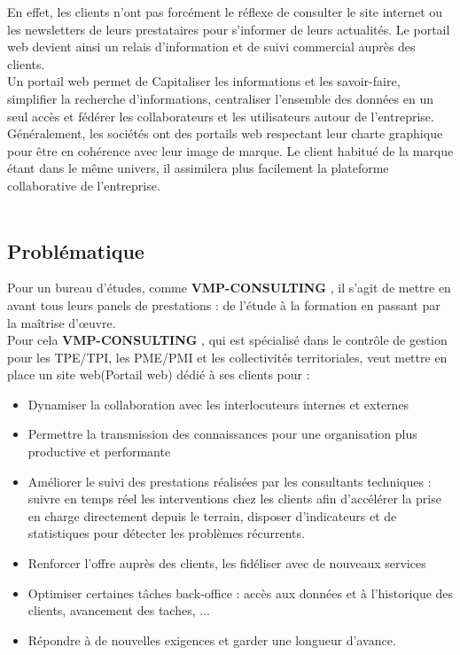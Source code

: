 \documentclass[12pt]{article}
\begin{document}
En effet, les clients n’ont pas forcément le réflexe de consulter le site internet ou les newsletters de leurs prestataires pour s’informer de leurs actualités. Le portail web devient ainsi un relais d’information et de suivi commercial auprès des clients.\\ Un portail web  permet de  Capitaliser les informations et les savoir-faire,
    simplifier la recherche d’informations,
    centraliser l’ensemble des données en un seul accès et
    fédérer les collaborateurs et les utilisateurs autour de l’entreprise.
\\
Généralement, les sociétés ont des portails web respectant leur charte graphique pour être en cohérence avec leur image de marque. Le client habitué de la marque étant dans le même univers, il assimilera plus facilement la plateforme collaborative de l’entreprise.\\

 \\
 
 \subsection{Problématique}
Pour un bureau d’études, comme \textbf{VMP-CONSULTING} , il s’agit de mettre en avant tous leurs panels de prestations : de l’étude à la formation en passant par la maîtrise d’œuvre.\\
Pour cela \textbf{VMP-CONSULTING} , qui est spécialisé dans le contrôle de gestion pour les TPE/TPI, les PME/PMI et les collectivités territoriales, veut mettre en place un site web(Portail web) dédié à ses clients pour :\\

\begin{itemize}

\item  Dynamiser la collaboration avec les interlocuteurs internes et externes
 \item   Permettre la transmission des connaissances pour une organisation plus productive et performante
 \item     Améliorer le suivi des prestations réalisées par les consultants techniques : suivre en temps réel les interventions chez les clients afin d’accélérer la prise en charge directement depuis le terrain, disposer d’indicateurs et de statistiques pour détecter les problèmes récurrents.
 
 \item   Renforcer  l'offre auprès des clients, les fidéliser avec de nouveaux services
 \item   Optimiser certaines tâches back-office : accès aux données et à l’historique des  clients, avancement des taches, ...
\item    Répondre à de nouvelles exigences et garder une longueur d’avance.

\end{itemize}
\end{document}
